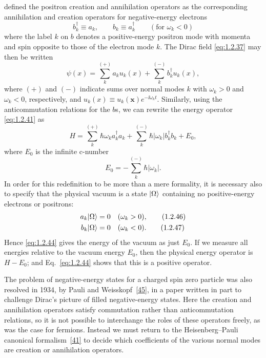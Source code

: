 defined the positron creation and annihilation operators as the corresponding
annihilation and creation operators for negative-energy electrons
\begin{equation}
  b_k^{\dagger}\equiv a_k,
  \qquad b_k\equiv a_k^{\dagger}
  \qquad(\text{for }\omega_k<0)
  \tag{1.2.42}\label{eq:1.2.42}
\end{equation}
where the label $k$ on $b$ denotes a positive-energy positron mode with
momenta and spin opposite to those of the electron mode $k$. The Dirac field
\eqref{eq:1.2.37} may then be written
\begin{equation}
  \psi(x)=\sum_k^{(+)}a_ku_k(x)+\sum_k^{(-)}b_k^{\dagger}u_k(x),
  \tag{1.2.43}\label{eq:1.2.43}
\end{equation}
where $(+)$ and $(-)$ indicate sums over normal modes $k$ with $\omega_k>0$
and $\omega_k<0$, respectively, and
$u_k(x)\equiv u_k(\mathbf x)e^{-\ii\omega_kt}$. Similarly, using the
anticommutation relations for the $b$s, we can rewrite the energy operator
\eqref{eq:1.2.41} as
\begin{equation}
  H=\sum_k^{(+)}\hbar\omega_ka_k^{\dagger}a_k
    +\sum_k^{(-)}\hbar|\omega_k|b_k^{\dagger}b_k+E_0,
  \tag{1.2.44}\label{eq:1.2.44}
\end{equation}
where $E_0$ is the infinite c-number
\begin{equation}
  E_0=-\sum_k^{(-)}\hbar|\omega_k|.
  \tag{1.2.45}\label{eq:1.2.45}
\end{equation}
In order for this redefinition to be more than a mere formality, it is
necessary also to specify that the physical vacuum is a state $\lvert \Omega\rangle$
containing no positive-energy electrons or positrons:
\begin{align}
  a_k\lvert \Omega\rangle&=0 &&(\omega_k>0),
  \tag{1.2.46}\label{eq:1.2.46}\\
  b_k\lvert \Omega\rangle&=0 &&(\omega_k<0).
  \tag{1.2.47}\label{eq:1.2.47}
\end{align}
Hence \eqref{eq:1.2.44} gives the energy of the vacuum as just $E_0$. If we measure
all energies relative to the vacuum energy $E_0$, then the physical energy
operator is $H-E_0$; and Eq.~\eqref{eq:1.2.44} shows that this is a positive operator.

The problem of negative-energy states for a charged spin zero particle was
also resolved in 1934, by Pauli and Weisskopf~\hyperref[ref:1.45]{[45]}, in a paper written in part
to challenge Dirac's picture of filled negative-energy states. Here the
creation and annihilation operators satisfy commutation rather than
anticommutation relations, so it is not possible to interchange the roles of
these operators freely, as was the case for fermions. Instead we must return
to the Heisenberg--Pauli canonical formalism~\hyperref[ref:1.41]{[41]} to decide which coefficients
of the various normal modes are creation or annihilation operators.

